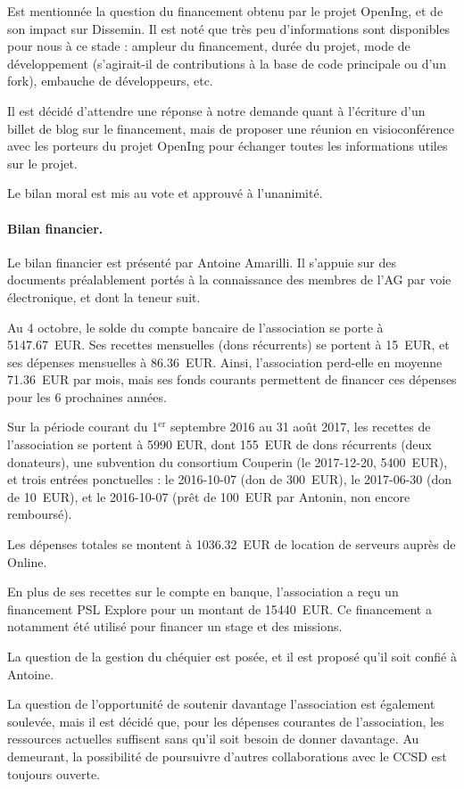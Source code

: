 \documentclass{scrartcl}
\begin{document}
Est mentionnée la question du financement obtenu par le projet OpenIng, et de son
impact sur Dissemin. Il est noté que très peu d'informations sont disponibles pour nous
à ce stade : ampleur du financement, durée du projet, mode de développement (s'agirait-il
de contributions à la base de code principale ou d'un fork), embauche de développeurs, etc.

Il est décidé d'attendre une réponse à notre demande quant à l'écriture d'un billet de blog
sur le financement, mais de proposer une réunion en visioconférence avec les porteurs du
projet OpenIng pour échanger toutes les informations utiles sur le projet.

Le bilan moral est mis au vote et approuvé à l'unanimité.

\paragraph{Bilan financier.} Le bilan financier est présenté par Antoine
Amarilli. Il s'appuie sur des documents préalablement portés à la connaissance des
membres de l'AG par voie électronique, et dont la teneur suit.

Au 4 octobre, le solde du compte bancaire de l'association se porte à 5147.67~EUR.
Ses recettes mensuelles (dons récurrents) se portent à 15~EUR, et ses dépenses
mensuelles à 86.36~EUR. Ainsi, l'association perd-elle en moyenne 71.36~EUR par
mois, mais ses fonds courants permettent de financer ces dépenses pour les 6
prochaines années.
 
Sur la période courant du 1$^{\mathrm{er}}$ septembre 2016 au 31 août 2017, les
recettes de l'association se portent à 5990 EUR, dont 155~EUR de dons récurrents
(deux donateurs), une subvention du consortium Couperin (le 2017-12-20,
5400~EUR), et trois entrées ponctuelles : le 2016-10-07 (don de 300~EUR), le 2017-06-30
(don de 10~EUR), et le 2016-10-07 (prêt de 100~EUR par Antonin, non encore remboursé).

Les dépenses totales se montent à 1036.32~EUR de location de serveurs auprès de
Online.
 
En plus de ses recettes sur le compte en banque, l'association a reçu un
financement PSL Explore pour un montant de 15440~EUR. Ce financement a notamment
été utilisé pour financer un stage et des missions.

La question de la gestion du chéquier est posée, et il est proposé qu'il soit confié à Antoine.

La question de l'opportunité de soutenir davantage l'association est également soulevée, mais il est
décidé que, pour les dépenses courantes de l'association, les ressources actuelles suffisent
sans qu'il soit besoin de donner davantage. Au demeurant, la possibilité de poursuivre
d'autres collaborations avec le CCSD est toujours ouverte.
\end{document}
